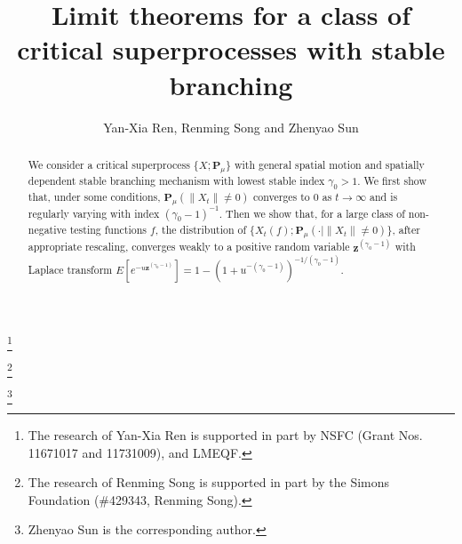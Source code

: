 \documentclass[12pt,a4paper]{amsart}
\theoremstyle{definition}
\numberwithin{equation}{section}
\begin{document}
\title
[Superprocesses with stable branching]
{\large Limit theorems for a class of critical superprocesses with stable branching}
\author[Y.-X. Ren, R. Song and Z. Sun]{Yan-Xia Ren, Renming Song and Zhenyao Sun}
\address
{Yan-Xia Ren\\
	School of Mathematical Sciences\\
	Peking University\\
	Beijing, P. R. China, 100871}
\thanks{The research of Yan-Xia Ren is supported in part by NSFC (Grant Nos. 11671017  and 11731009), and LMEQF.
}
\address
{Renming Song\\
	Dept of Mathematics\\
	University of Illinois at Urbana-Champaign\\
	Urbana, IL 61801}
\thanks{The research of Renming Song is supported in part by the Simons Foundation (\#429343, Renming Song).}
\address
{Zhenyao Sun\\
School of Mathematics and Statistics\\
Wuhan University\\
Wuhan, Hubei 430072, P. R. China}
\thanks{Zhenyao Sun is the corresponding author.}
\begin{abstract}
  We consider a critical superprocess $\{X;\mathbf P_\mu\}$ with general spatial motion and spatially dependent stable branching mechanism with lowest stable index $\gamma_0 > 1$. We first show that, under some conditions, $\mathbf P_{\mu}(\|X_t\|\neq 0)$ converges to $0$ as $t\to \infty$ and is regularly varying with index $(\gamma_0-1)^{-1}$. Then we show that, for a large class of non-negative testing functions $f$, the distribution of $\{X_t(f);\mathbf P_\mu(\cdot|\|X_t\|\neq 0)\}$, after appropriate rescaling, converges weakly to a positive random variable $\mathbf z^{(\gamma_0-1)}$ with Laplace transform $E[e^{-u\mathbf z^{(\gamma_0-1)}}]=1-(1+u^{-(\gamma_0-1)})^{-1/(\gamma_0-1)}.$
\end{abstract}
\maketitle
\end{document}
